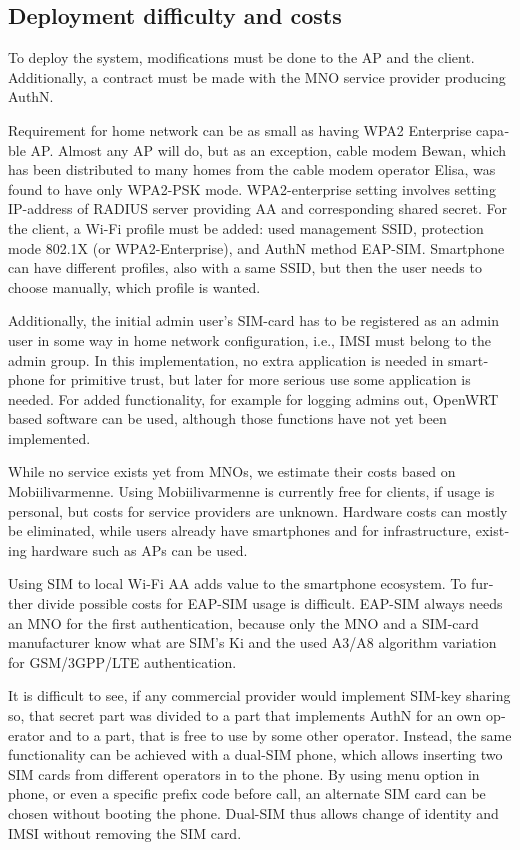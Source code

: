 \documentclass[12pt,a4paper,english]{tutthesis}
\begin{document}
\begin{otherlanguage}{english}
\section{Deployment difficulty and costs}
\label{sec-6-2}

To deploy the system, modifications must be done to the AP and the client.
Additionally, a contract must be made with the MNO service
provider producing AuthN.

Requirement for home network can be as small as having WPA2 Enterprise capable
AP. Almost any AP will do, but as an exception, cable modem Bewan, which 
has been distributed to many homes from the cable modem operator Elisa, was found to have only WPA2-PSK mode.
WPA2-enterprise setting involves setting IP-address of RADIUS server providing 
AA and corresponding shared secret.
For  the client, a Wi-Fi profile must be added: used management SSID,
protection mode 802.1X (or WPA2-Enterprise), and AuthN method EAP-SIM.
Smartphone can have different profiles, also with a same SSID, but
then the user needs to choose manually, which profile is wanted.

Additionally, the initial admin user's SIM-card has to be registered as an
admin user in some way in home network 
configuration, i.e., IMSI must belong to the admin group.
In this implementation, no extra application is needed in smartphone
for primitive trust, but later for more serious use some application is needed.
For added functionality, for example for logging admins out, OpenWRT
based software can be used, although those functions have not yet been
implemented.





While no service exists yet from MNOs, we estimate their costs based
on Mobiilivarmenne. Using Mobiilivarmenne is currently free for
clients, if usage is personal, but costs for service providers are
unknown.  Hardware costs can mostly be eliminated, while users already
have smartphones and for infrastructure, existing hardware such as APs
can be used.

Using SIM to local Wi-Fi AA adds value to the smartphone ecosystem.
To further divide possible costs for EAP-SIM usage
is difficult.
EAP-SIM always needs an MNO for the first authentication,
because only the MNO and a SIM-card manufacturer know 
what are SIM's Ki and the used A3/A8 algorithm variation
for GSM/3GPP/LTE authentication.

It is difficult to see, if any commercial provider would implement
SIM-key sharing so, that secret part was divided to a part that
implements AuthN for an own operator and to a part, that is free to
use by some other operator.  Instead, the same functionality can be achieved with
a dual-SIM phone, which allows inserting two SIM cards from different
operators in to the phone. By using menu option in phone, or even a
specific prefix code before call, an alternate SIM card can be chosen
without booting the phone.
Dual-SIM thus allows change of identity and IMSI without removing the SIM card.


\end{otherlanguage}
\end{document}
